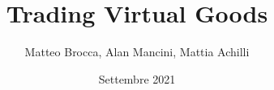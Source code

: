 \documentclass[12pt,a4paper]{article}
\title{Trading Virtual Goods}
\author{Matteo Brocca, Alan Mancini, Mattia Achilli}
\date{Settembre 2021}\let\Date
\begin{document}
\begin{titlepage}
\begin{center}
	{{\Large{\textsc{Alma Mater Studiorum $\cdot$ Universit\`a di Bologna}}}} \rule[0.1cm]{15.8cm}{0.1mm}
	\rule[0.5cm]{15.8cm}{0.6mm}
	{\small{\bf Corso di\\Applciazioni e Servizi Web\\Docenti: Silvia Mirri, Roberto Girau}}
\end{center}
\vspace{15mm}
\begin{center}
	{\Huge{\bf TRADING}}\\
	\vspace{4mm}
	{\Huge{\bf VIRTUAL}}\\
	\vspace{4mm}
	{\Huge{\bf GOODS}}\\
\end{center}
\vspace{40mm}
\par
\noindent
\begin{center}
{\large{
	\textit{Autori}:\\  
	Matteo Brocca $\cdot$ 1005681\\
	Alan Mancini $\cdot$ 1005481\\
	Mattia Achilli $\cdot$ 979641\\
}}
\end{center}
\vspace{40mm}
\begin{center}
	\large{Settembre 2021}
\end{center}
\end{titlepage}

\newpage

\tableofcontents
\newpage












\end{document}
